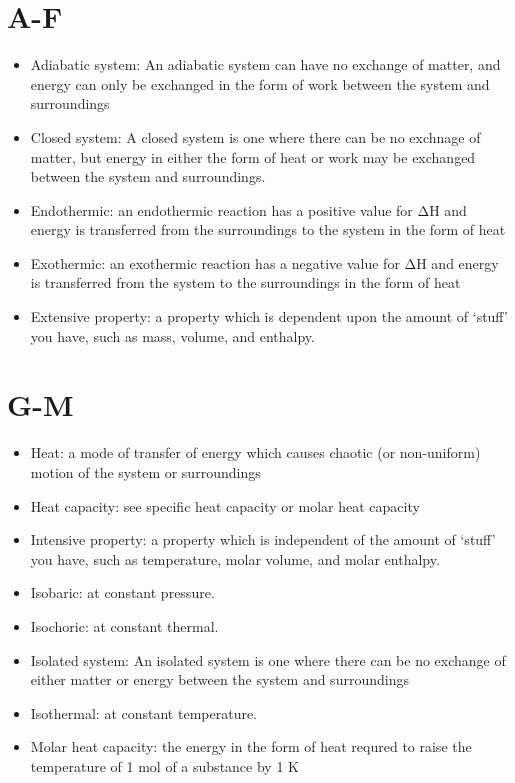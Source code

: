 \documentclass[
]{book}
\begin{document}
\hypertarget{a-f}{%
\section*{A-F}\label{a-f}}

\begin{itemize}
\item
  Adiabatic system: An adiabatic system can have no exchange of matter, and energy can only be exchanged in the form of work between the system and surroundings
\item
  Closed system: A closed system is one where there can be no exchnage of matter, but energy in either the form of heat or work may be exchanged between the system and surroundings.
\item
  Endothermic: an endothermic reaction has a positive value for ΔH and energy is transferred from the surroundings to the system in the form of heat
\item
  Exothermic: an exothermic reaction has a negative value for ΔH and energy is transferred from the system to the surroundings in the form of heat
\item
  Extensive property: a property which is dependent upon the amount of `stuff' you have, such as mass, volume, and enthalpy.
\end{itemize}

\hypertarget{g-m}{%
\section*{G-M}\label{g-m}}

\begin{itemize}
\item
  Heat: a mode of transfer of energy which causes chaotic (or non-uniform) motion of the system or surroundings
\item
  Heat capacity: see specific heat capacity or molar heat capacity
\item
  Intensive property: a property which is independent of the amount of `stuff' you have, such as temperature, molar volume, and molar enthalpy.
\item
  Isobaric: at constant pressure.
\item
  Isochoric: at constant thermal.
\item
  Isolated system: An isolated system is one where there can be no exchange of either matter or energy between the system and surroundings
\item
  Isothermal: at constant temperature.
\item
  Molar heat capacity: the energy in the form of heat requred to raise the temperature of 1 mol of a substance by 1 K
\end{itemize}
\end{document}
